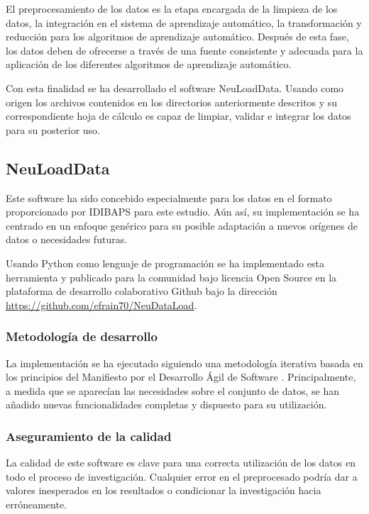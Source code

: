El preprocesamiento de los datos es la etapa encargada de la limpieza de los datos, la integración en el sistema de aprendizaje automático, la transformación y reducción para los algoritmos de aprendizaje automático. Después de esta fase, los datos deben de ofrecerse a través de una fuente consistente y adecuada para la aplicación de los diferentes algoritmos de aprendizaje automático.

Con esta finalidad se ha desarrollado el software NeuLoadData. Usando como origen los archivos contenidos en los directorios anteriormente descritos y su correspondiente hoja de cálculo es capaz de limpiar, validar e integrar los datos para su posterior uso.

\subsection{NeuLoadData}
Este software ha sido concebido especialmente para los datos en el formato proporcionado por IDIBAPS para este estudio. Aún así, su implementación se ha centrado en un enfoque genérico para su posible adaptación a nuevos orígenes de datos o necesidades futuras.

Usando Python como lenguaje de programación se ha implementado esta herramienta y publicado para la comunidad bajo licencia Open Source en la plataforma de desarrollo colaborativo Github \cite{WhatGitHub.} bajo la dirección \url{https://github.com/efrain70/NeuDataLoad}.

\subsubsection{Metodología de desarrollo}

La implementación se ha ejecutado siguiendo una metodología iterativa basada en los principios del Manifiesto por el Desarrollo Ágil de Software \cite{ManifiestoSoftware}. Principalmente, a medida que se aparecían las necesidades sobre el conjunto de datos, se han añadido nuevas funcionalidades completas y dispuesto para su utilización.

\subsubsection{Aseguramiento de la calidad}
La calidad de este software es clave para una correcta utilización de los datos en todo el proceso de investigación. Cualquier error en el preprocesado podría dar a valores inesperados en los resultados o condicionar la investigación hacia erróneamente.


